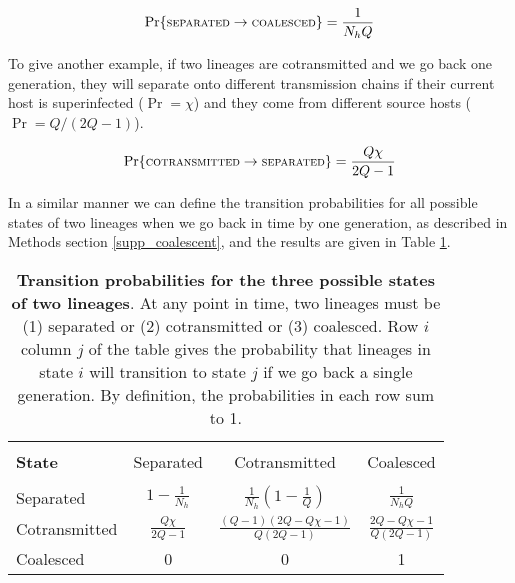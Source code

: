 \documentclass[_main.tex]{subfiles}
\begin{document}
\begin{equation*} \label{eq:coal3}
\Pr \{ \textsc{\small{separated}} \rightarrow \textsc{\small{coalesced}} \} 
= \frac{1}{N_hQ}
\end{equation*}

To give another example, if two lineages are cotransmitted and we go back one generation, they will separate onto different transmission chains if their current host is superinfected ($\Pr = \chi$) and they come from different source hosts ($\Pr = Q/(2Q-1)$).

\begin{equation*} \label{eq:coal4}
\Pr \{ \textsc{\small{cotransmitted}} \rightarrow \textsc{\small{separated}} \} 
= \frac{Q\chi}{2Q-1}
\end{equation*}

In a similar manner we can define the transition probabilities for all possible states of two lineages when we go back in time by one generation, as described in Methods section \ref{supp_coalescent}, and the results are given in Table \ref{tab:main_tr_matrix}.

\renewcommand\theadalign{bc} 

\begin{table}[h!] 
\centering
\large{
\begin{tabular}{l | c c c } 
\hline \\
\textbf{\small{State}} & \small{Separated} & \small{Cotransmitted} & \small{Coalesced} \\ [0.5ex] 
\hline \\
\small{Separated} & $1 - \frac{1}{N_h}$ & $\frac{1}{N_h} (1 - \frac{1}{Q})$ 
& $\frac{1}{N_hQ}$ \\ [2ex]
\small{Cotransmitted} & $\frac{Q\chi}{2Q-1}$ & $\frac{(Q-1)(2Q - Q\chi - 1)}{Q(2Q-1)}$
& $\frac{2Q - Q\chi - 1}{Q(2Q-1)}$ \\ [2ex] 
\small{Coalesced} & 0 & 0 & 1 \\ [1ex]  
\hline
\end{tabular}
}
\caption{\small{\textbf{Transition probabilities for the three possible states of two lineages}. At any point in time, two lineages must be (1) separated or (2) cotransmitted or (3) coalesced. Row $i$ column $j$ of the table gives the probability that lineages in state $i$ will transition to state $j$ if we go back a single generation.  By definition, the probabilities in each row sum to 1.}}
\label{tab:main_tr_matrix}
\end{table}

\end{document}
